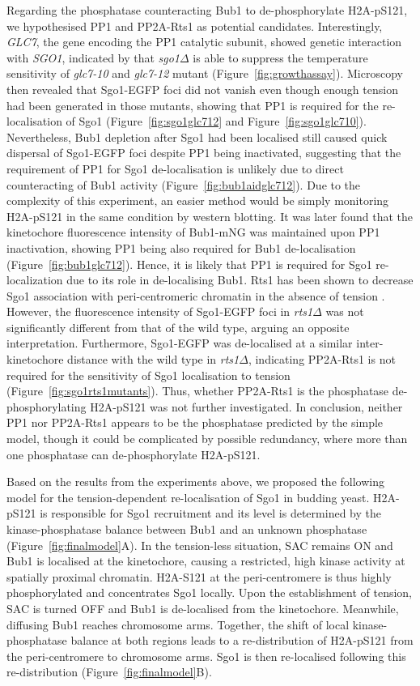Regarding the phosphatase counteracting Bub1 to de-phosphorylate H2A-pS121, we hypothesised PP1 and PP2A-Rts1 as potential candidates. Interestingly, \textit{GLC7}, the gene encoding the PP1 catalytic subunit, showed genetic interaction with \textit{SGO1}, indicated by that \textit{sgo1$\Delta$} is able to suppress the temperature sensitivity of \textit{glc7-10} and \textit{glc7-12} mutant (Figure~\ref{fig:growthassay}). Microscopy then revealed that Sgo1-EGFP foci did not vanish even though enough tension had been generated in those mutants, showing that PP1 is required for the re-localisation of Sgo1 (Figure~\ref{fig:sgo1glc712} and Figure~\ref{fig:sgo1glc710}). Nevertheless, Bub1 depletion after Sgo1 had been localised still caused quick dispersal of Sgo1-EGFP foci despite PP1 being inactivated, suggesting that the requirement of PP1 for Sgo1 de-localisation is unlikely due to direct counteracting of Bub1 activity (Figure~\ref{fig:bub1aidglc712}). Due to the complexity of this experiment, an easier method would be simply monitoring H2A-pS121 in the same condition by western blotting. It was later found that the kinetochore fluorescence intensity of Bub1-mNG was maintained upon PP1 inactivation, showing PP1 being also required for Bub1 de-localisation (Figure~\ref{fig:bub1glc712}). Hence, it is likely that PP1 is required for Sgo1 re-localization due to its role in de-localising Bub1. Rts1 has been shown to decrease Sgo1 association with peri-centromeric chromatin in the absence of tension \citep{Nerusheva2014}. However, the fluorescence intensity of Sgo1-EGFP foci in \textit{rts1$\Delta$} was not significantly different from that of the wild type, arguing an opposite interpretation. Furthermore, Sgo1-EGFP was de-localised at a similar inter-kinetochore distance with the wild type in \textit{rts1$\Delta$}, indicating PP2A-Rts1 is not required for the sensitivity of Sgo1 localisation to tension (Figure~\ref{fig:sgo1rts1mutants}). Thus, whether PP2A-Rts1 is the phosphatase de-phosphorylating H2A-pS121 was not further investigated. In conclusion, neither PP1 nor PP2A-Rts1 appears to be the phosphatase predicted by the simple model, though it could be complicated by possible redundancy, where more than one phosphatase can de-phosphorylate H2A-pS121. 

Based on the results from the experiments above, we proposed the following model for the tension-dependent re-localisation of Sgo1 in budding yeast. H2A-pS121 is responsible for Sgo1 recruitment and its level is determined by the kinase-phosphatase balance between Bub1 and an unknown phosphatase (Figure~\ref{fig:finalmodel}A). In the tension-less situation, SAC remains ON and Bub1 is localised at the kinetochore, causing a restricted, high kinase activity at spatially proximal chromatin. H2A-S121 at the peri-centromere is thus highly phosphorylated and concentrates Sgo1 locally. Upon the establishment of tension, SAC is turned OFF and Bub1 is de-localised from the kinetochore. Meanwhile, diffusing Bub1 reaches chromosome arms. Together, the shift of local kinase-phosphatase balance at both regions leads to a re-distribution of H2A-pS121 from the peri-centromere to chromosome arms. Sgo1 is then re-localised following this re-distribution (Figure~\ref{fig:finalmodel}B). 

